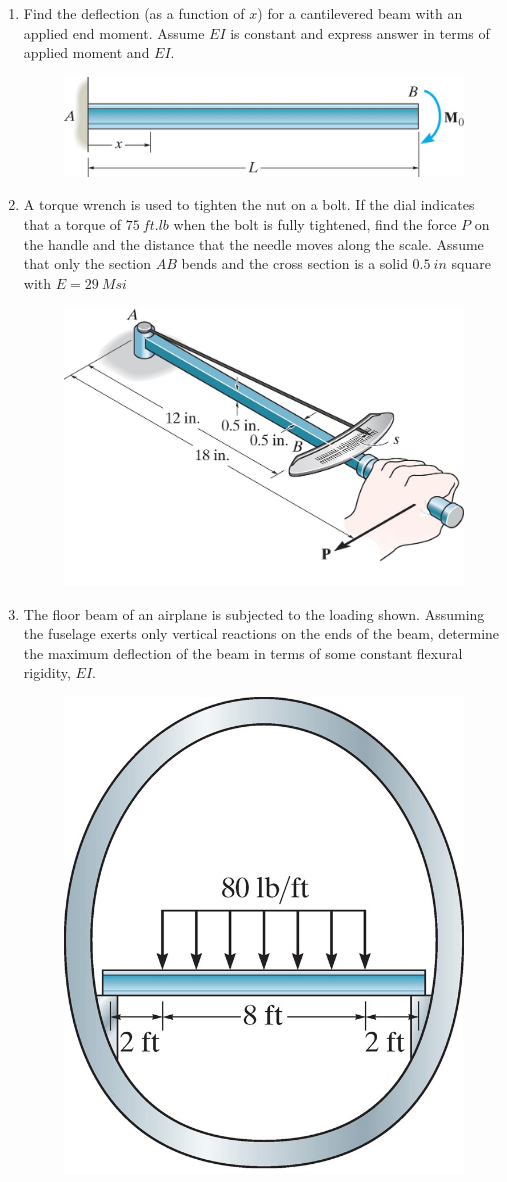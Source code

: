 \documentclass[12pt, oneside]{article}
\let\US\SI
\begin{document}
\begin{enumerate}
	\item %
		Find the deflection (as a function of $x$) for a cantilevered beam with an applied end moment.
		Assume $EI$ is constant and express answer in terms of applied moment and $EI$.
		\begin{figure}[H]
			\centering
			\includegraphics[width=0.6\linewidth]{12-6}
		\end{figure}

	\item %
		A torque wrench is used to tighten the nut on a bolt.
		If the dial indicates that a torque of $ 	\US{75}{ft.lb}  $ when the bolt is fully tightened, find the force $P$ on the handle and the distance that the needle moves along the scale.
		Assume that only the section $AB$ bends and the cross section is a solid $ 	\US{0.5 }{in}  $ square with $E = 	\US{29 }{Msi} $
		\begin{figure}[H]
			\centering
			\includegraphics[width=0.6\linewidth]{12-15}
		\end{figure}
		\newpage

	\item %
		The floor beam of an airplane is subjected to the loading shown.
		Assuming the fuselage exerts only vertical reactions on the ends of the beam, determine the maximum deflection of the beam in terms of some constant flexural rigidity, $EI$.
		\begin{figure}[H]
			\centering
			\includegraphics[width=0.6\linewidth]{12-25}
		\end{figure}


\end{enumerate}
\end{document}
